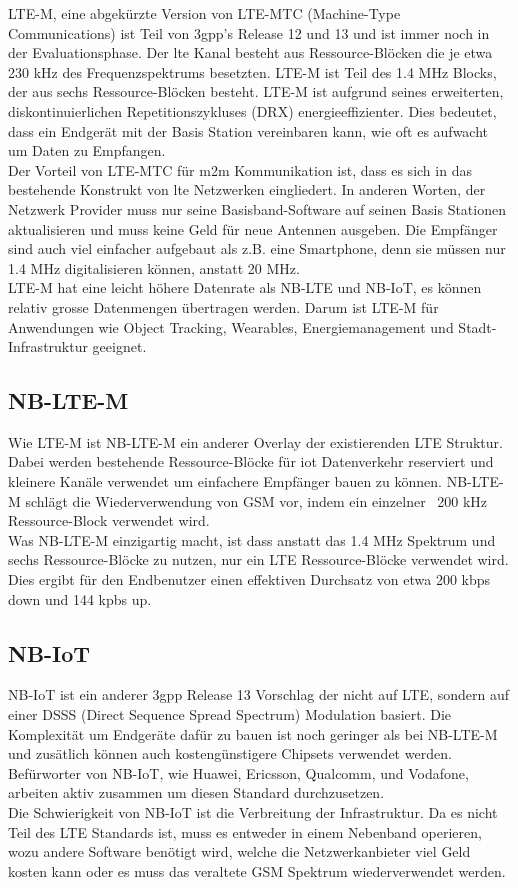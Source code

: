LTE-M, eine abgekürzte Version von LTE-MTC (Machine-Type Communications) ist Teil von \gls{3gpp}'s Release 12 und 13 und ist immer noch in der Evaluationsphase. Der \gls{lte} Kanal besteht aus Ressource-Blöcken die je etwa 230 kHz des Frequenzspektrums besetzten. LTE-M ist Teil des 1.4 MHz Blocks, der aus sechs Ressource-Blöcken besteht. LTE-M ist aufgrund seines erweiterten, diskontinuierlichen Repetitionszykluses (DRX) energieeffizienter. Dies bedeutet, dass ein Endgerät mit der Basis Station vereinbaren kann, wie oft es aufwacht um Daten zu Empfangen.\\
Der Vorteil von LTE-MTC für \acrshort{m2m} Kommunikation ist, dass es sich in das bestehende Konstrukt von \gls{lte} Netzwerken eingliedert. In anderen Worten, der Netzwerk Provider muss nur seine Basisband-Software auf seinen Basis Stationen aktualisieren und muss keine Geld für neue Antennen ausgeben. Die Empfänger sind auch viel einfacher aufgebaut als z.B. eine Smartphone, denn sie müssen nur 1.4 MHz digitalisieren können, anstatt 20 MHz.\\
LTE-M hat eine leicht höhere Datenrate als NB-LTE und NB-IoT, es können relativ grosse Datenmengen übertragen werden. Darum ist LTE-M für Anwendungen wie Object Tracking, Wearables, Energiemanagement und Stadt-Infrastruktur geeignet. 

\subsection{NB-LTE-M}

Wie LTE-M ist NB-LTE-M ein anderer Overlay der existierenden LTE Struktur. Dabei werden bestehende Ressource-Blöcke für \gls{iot} Datenverkehr reserviert und kleinere Kanäle verwendet um einfachere Empfänger bauen zu können. NB-LTE-M schlägt die Wiederverwendung von GSM vor, indem ein einzelner ~200 kHz Ressource-Block verwendet wird.\\
Was NB-LTE-M einzigartig macht, ist dass anstatt das 1.4 MHz Spektrum und sechs Ressource-Blöcke zu nutzen, nur ein LTE Ressource-Blöcke verwendet wird. Dies ergibt für den Endbenutzer einen effektiven Durchsatz von etwa 200 kbps down und 144 kpbs up.

\subsection{NB-IoT}

NB-IoT ist ein anderer \gls{3gpp} Release 13 Vorschlag der nicht auf LTE, sondern auf einer DSSS (Direct Sequence Spread Spectrum) Modulation basiert. Die Komplexität um Endgeräte dafür zu bauen ist noch geringer als bei NB-LTE-M und zusätlich können auch kostengünstigere Chipsets verwendet werden. Befürworter von NB-IoT, wie Huawei, Ericsson, Qualcomm, und Vodafone, arbeiten aktiv zusammen um diesen Standard durchzusetzen.\\
Die Schwierigkeit von NB-IoT ist die Verbreitung der Infrastruktur. Da es nicht Teil des LTE Standards ist, muss es entweder in einem Nebenband operieren, wozu andere Software benötigt wird, welche die Netzwerkanbieter viel Geld kosten kann oder es muss das veraltete GSM Spektrum wiederverwendet werden.

